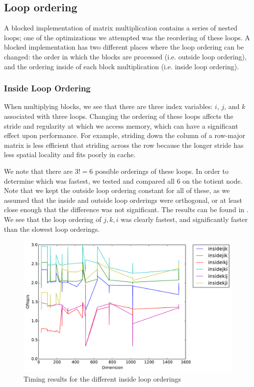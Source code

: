 \subsection{Loop ordering}\label{sec:loopordering}
A blocked implementation of matrix multiplication contains a series of nested
loops; one of the optimizations we attempted was the reordering of these loops.
A blocked implementation has two different places where the loop ordering can
be changed: the order in which the blocks are processed (i.e. outside loop
ordering), and the ordering inside of each block multiplication (i.e. inside
loop ordering).

\subsubsection{Inside Loop Ordering}
When multiplying blocks, we see that there are three index variables: $i$, $j$,
and $k$ associated with three loops. Changing the ordering of these loops
affects the stride and regularity at which we access memory, which can have a
significant effect upon performance. For example, striding down the column of a
row-major matrix is less efficient that striding across the row because the
longer stride has less spatial locality and fits poorly in cache.

We note that there are $3! = 6$ possible orderings of these loops. In order to
determine which was fastest, we tested and compared all 6 on the totient node.
Note that we kept the outside loop ordering constant for all of these, as we
assumed that the inside and outside loop orderings were orthogonal, or at least
close enough that the difference was not significant. The results can be found
in . We see that the loop ordering of $j,k,i$ was
clearly fastest, and significantly faster than the slowest loop orderings.

\begin{figure}[hh]
  \centering
  \includegraphics[width=\textwidth]{img/timing_insideloops.pdf}
  \caption{Timing results for the different inside loop orderings}
  \label{fig:insideloop}
\end{figure}

